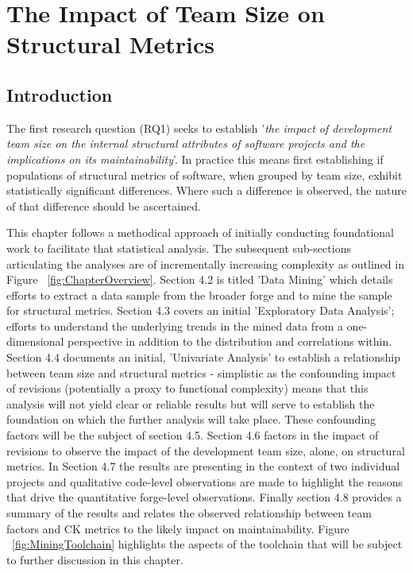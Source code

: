 
\graphicspath{{Chapter4/Figures/}{Chapter4/Tables/}{Chapter4/Charts/}}

\chapter{The Impact of Team Size on Structural Metrics}
\section{Introduction} %

The first research question (RQ1) seeks to establish '\textit{the impact of development team size on the internal structural attributes of software projects and the implications on its maintainability}'. In practice this means first establishing if populations of structural metrics of software, when grouped by team size, exhibit statistically significant differences. Where such a difference is observed, the nature of that difference should be ascertained.

This chapter follows a methodical approach of initially conducting foundational work to facilitate that statistical analysis. The subsequent sub-sections articulating the analyses are of incrementally increasing complexity as outlined in Figure ~\ref{fig:ChapterOverview}. Section 4.2 is titled 'Data Mining' which details efforts to extract a data sample from the broader forge and to mine the sample for structural metrics. Section 4.3 covers an initial 'Exploratory Data Analysis'; efforts to understand the underlying trends in the mined data from a one-dimensional perspective in addition to the distribution and correlations within. Section 4.4 documents an initial, 'Univariate Analysis' to establish a relationship between team size and structural metrics - simplistic as the confounding impact of revisions (potentially a proxy to functional complexity) means that this analysis will not yield clear or reliable results but will serve to establish the foundation on which the further analysis will take place. These confounding factors will be the subject of section 4.5. Section 4.6 factors in the impact of revisions to observe the impact of the development team size, alone, on structural metrics. In Section 4.7 the results are presenting in the context of two individual projects and qualitative code-level observations are made to highlight the reasons that drive the quantitative forge-level observations. Finally section 4.8 provides a summary of the results and relates the observed relationship between team factors and CK metrics to the likely impact on maintainability. Figure ~\ref{fig:MiningToolchain} highlights the aspects of the toolchain that will be subject to further discussion in this chapter.

